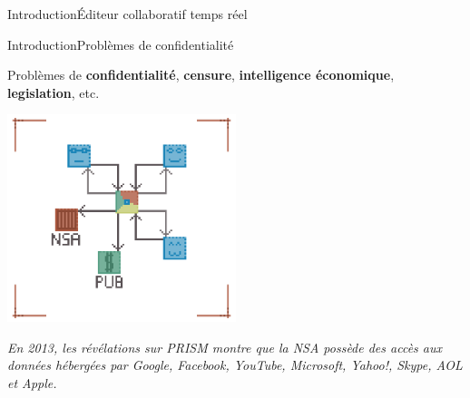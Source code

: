 \begin{frame}{Introduction}{Éditeur collaboratif temps réel}
  
  
\end{frame}


\begin{frame}{Introduction}{Problèmes de confidentialité}
  
  Problèmes de \textbf{confidentialité}, \textbf{censure},
  \textbf{intelligence économique}, \textbf{legislation}, etc.

  \vspace{0.5cm}
  \begin{center}
    \includegraphics[width=0.5\textwidth]{img/centralizedethicproblems.png}
  \end{center}
  
  \vspace{0.5cm}

  \textit{En 2013, les révélations sur PRISM montre que la NSA possède des
    accès aux données hébergées par Google, Facebook, YouTube, Microsoft,
    Yahoo!, Skype, AOL et Apple.}

\end{frame}

